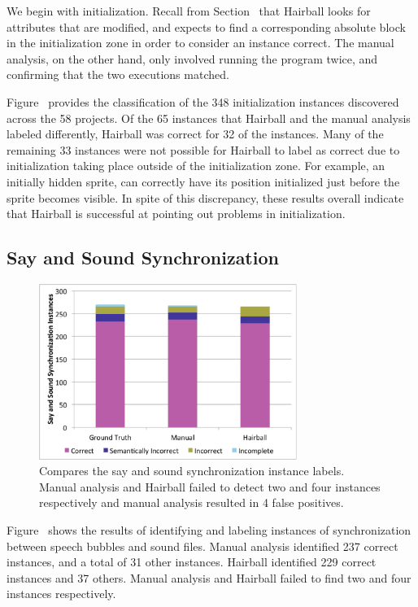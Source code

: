 We begin with initialization. Recall from Section~ that
Hairball looks for attributes that are modified, and expects to find a
corresponding absolute block in the initialization zone in order to consider an
instance correct. The manual analysis, on the other hand, only involved running
the program twice, and confirming that the two executions matched.

Figure~ provides the classification of the 348
initialization instances discovered across the 58 projects. Of the 65 instances
that Hairball and the manual analysis labeled differently, Hairball was correct
for 32 of the instances. Many of the remaining 33 instances were not possible
for Hairball to label as correct due to initialization taking place outside of
the initialization zone. For example, an initially hidden sprite, can correctly
have its position initialized just before the sprite becomes visible. In spite
of this discrepancy, these results overall indicate that Hairball is successful
at pointing out problems in initialization.

\subsection{Say and Sound Synchronization}
\begin{figure}[!t]
\centering \includegraphics[trim=.3in .15in .3in .15in, clip,
  width=3.3in]{graphs/AutoSaySoundSync.eps}
\caption{Compares the say and sound synchronization instance labels. Manual
  analysis and Hairball failed to detect two and four instances respectively
  and manual analysis resulted in 4 false positives.}
\end{figure}


Figure~ shows the results of identifying and
labeling instances of synchronization between speech bubbles and sound
files. Manual analysis identified 237 correct instances, and a total of 31
other instances. Hairball identified 229 correct instances and 37
others. Manual analysis and Hairball failed to find two and four instances
respectively.

